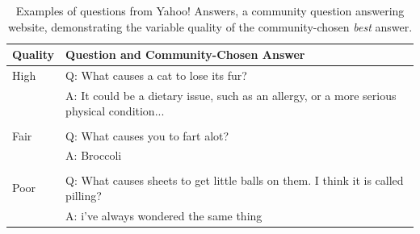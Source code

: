 \begin{table}[t]
\begin{center}
\begin{tabularx}{0.8\linewidth}{p{1.5cm}p{10cm}}
\hline 
 Quality & Question and Community-Chosen Answer \\
 \hline
 High & Q: What causes a cat to lose its fur? \\
 		& A: It could be a dietary issue, such as an allergy, or a more serious physical condition...\\
 	&	\\
 Fair &  Q: What causes you to fart alot? \\
 		&	A: Broccoli	\\
 &		\\
 Poor	&	Q: What causes sheets to get little balls on them. I think it is called pilling? \\
 		 &  A: i've always wondered the same thing \\
\end{tabularx}
\caption{{  Examples of questions from Yahoo! Answers, a community question answering website, demonstrating the variable quality of the community-chosen \textit{best} answer. }}
\label{tab:cqa_quality}
\end{center}
\end{table}


